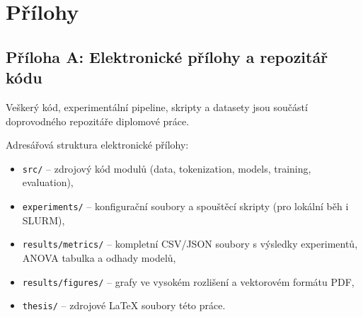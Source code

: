 \chapter*{Přílohy}

\section*{Příloha A: Elektronické přílohy a repozitář kódu}
Veškerý kód, experimentální pipeline, skripty a datasety jsou součástí doprovodného repozitáře diplomové práce.

Adresářová struktura elektronické přílohy:
\begin{itemize}
    \item \texttt{src/} -- zdrojový kód modulů (data, tokenization, models, training, evaluation),
    \item \texttt{experiments/} -- konfigurační soubory a spouštěcí skripty (pro lokální běh i SLURM),
    \item \texttt{results/metrics/} -- kompletní CSV/JSON soubory s výsledky experimentů, ANOVA tabulka a odhady modelů,
    \item \texttt{results/figures/} -- grafy ve vysokém rozlišení a vektorovém formátu PDF,
    \item \texttt{thesis/} -- zdrojové LaTeX soubory této práce.
\end{itemize}
